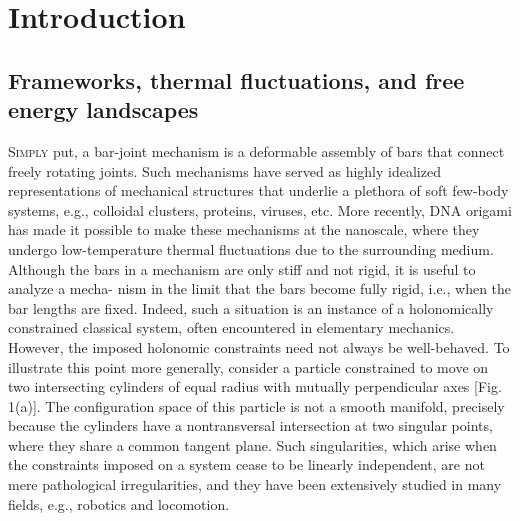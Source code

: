 
\chapter{Introduction}


\section{Frameworks, thermal fluctuations, and free energy landscapes}

\textsc{Simply} put, a bar-joint mechanism is a deformable assembly of bars that connect freely rotating joints. Such mechanisms have served as highly idealized representations of mechanical structures that underlie a plethora of soft few-body systems, e.g., colloidal clusters, proteins, viruses, etc. More recently, DNA origami has made it possible to make these mechanisms at the nanoscale, where they undergo low-temperature thermal fluctuations due to the surrounding medium. Although the bars in a mechanism are only stiff and not rigid, it is useful to analyze a mecha- nism in the limit that the bars become fully rigid, i.e., when the bar lengths are fixed. Indeed, such a situation is an instance of a holonomically constrained classical system, often encountered in elementary mechanics.
However, the imposed holonomic constraints need not always be well-behaved.
To illustrate this point more generally, consider a particle constrained to move on two intersecting cylinders of equal radius with mutually perpendicular axes [Fig. 1(a)].
The configuration space of this particle is not a smooth manifold, precisely because the cylinders have a nontransversal intersection at two singular points, where they share a common tangent plane.
Such singularities, which arise when the constraints imposed on a system cease to be linearly independent, are not mere pathological irregularities, and they have been extensively studied in many fields, e.g., robotics and locomotion.

